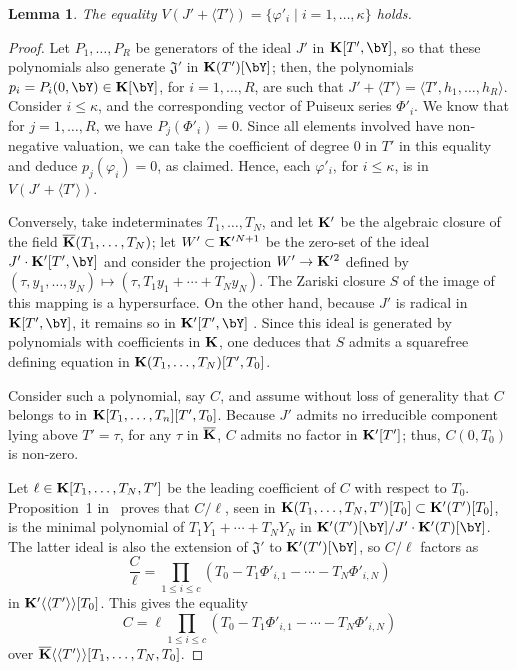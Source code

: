 \documentclass[12pt]{article}
\newtheorem{lemma}[definition]{Lemma}
\begin{document}
\begin{lemma}\label{lemma:Z1}
  The equality $V(J' +\langle T' \rangle)=\{\varphi'_i \mid i=1,\dots,\kappa\}$ holds.
\end{lemma}
\begin{proof}
  Let $P_1,\dots,P_R$ be generators of the ideal $J'$ in
  $\KK[T',\bY]$, so that these polynomials also generate
  $\mathfrak{J}'$ in $\KK(T')[\bY]$; then, the polynomials
  $p_i=P_i(0,\bY) \in \KK[\bY]$, for $i=1,\dots,R$, are such that
  $J'+\langle T'\rangle = \langle T',h_1,\dots,h_R \rangle$.  Consider
  $i \le \kappa$, and the corresponding vector of Puiseux series
  $\Phi'_i$. We know that for $j=1,\dots,R$, we have $P_j(\Phi'_i)=0$.
  Since all elements involved have non-negative valuation, we can take
  the coefficient of degree $0$ in $T'$ in this equality and deduce
  $p_j(\varphi_i)=0$, as claimed. Hence, each $\varphi'_i$, for $i \le
  \kappa$, is in $V(J' + \langle T' \rangle)$.

  Conversely, take indeterminates $T_1,\dots,T_N$, and let $\mathbf{K}'$ be
  the algebraic closure of the field $\overline{\mathbf{K}}(T_1,\dots,T_N)$; let
  $W'\subset{\ensuremath{\mathbf{K}}'}{}^{N+1}$ be the zero-set of the ideal $J'\cdot
  \KK'[T',\bY]$ and consider the projection $W' \to {\ensuremath{\mathbf{K}}'}{}^2$ defined
  by $(\tau,y_1,\dots,y_N)\mapsto (\tau,T_1 y_1 + \cdots + T_N y_N)$. The
  Zariski closure $S$ of the image of this mapping is a
  hypersurface. On the other hand, because $J'$ is radical 
  in $\KK[T',\bY]$, it remains so in $\KK'[T',\bY]$ . Since
  this ideal is generated by polynomials with coefficients in $\mathbf{K}$,
  one deduces that $S$ admits a squarefree defining equation in
  $\mathbf{K}(T_1,\dots,T_N)[T',T_0]$.

  Consider such a polynomial, say $C$, and assume without loss of
  generality that $C$ belongs to in
  $\mathbf{K}[T_1,\dots,T_n][T',T_0]$. Because $J'$ admits no irreducible
  component lying above $T'=\tau$, for any $\tau$ in $\overline{\mathbf{K}}$, $C$
  admits no factor in $\mathbf{K}'[T']$; thus, $C(0,T_0)$ is non-zero.

  Let $\ell \in \mathbf{K}[T_1,\dots,T_N,T']$ be the leading coefficient of
  $C$ with respect to $T_0$. Proposition~1 in~\cite{Schost03} proves
  that $C/\ell$, seen in $\mathbf{K}(T_1,\dots,T_N,T')[T_0] \subset
  \mathbf{K}'(T')[T_0]$, is the minimal polynomial of $T_1 Y_1 + \cdots +
  T_N Y_N$ in $\KK'(T')[\bY]/J'\cdot \KK'(T)[\bY]$. The latter ideal
  is also the extension of $\mathfrak{J}'$ to $\KK'(T')[\bY]$, 
  so $C/\ell$ factors as
  $$\frac C\ell = \prod_{1\le i \le c}(T_0-T_1 \Phi'_{i,1} - \cdots - T_N \Phi'_{i,N})$$
  in $\mathbf{K}'\langle\langle T' \rangle\rangle[T_0]$.
  This gives the equality 
  $$C =\ell \prod_{1\le i \le  c}(T_0-T_1 \Phi'_{i,1} - \cdots - T_N
  \Phi'_{i,N})$$ over $\overline{\mathbf{K}}\langle\langle T' \rangle\rangle[T_1,\dots,T_N,T_0]$. 


\end{proof}
\end{document}
